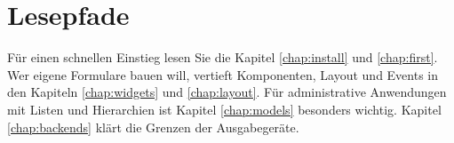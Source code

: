 \section{Lesepfade}
Für einen schnellen Einstieg lesen Sie die Kapitel
\ref{chap:install} und \ref{chap:first}. Wer eigene Formulare bauen will,
vertieft Komponenten, Layout und Events in den Kapiteln
\ref{chap:widgets} und \ref{chap:layout}. Für administrative Anwendungen
mit Listen und Hierarchien ist Kapitel \ref{chap:models} besonders wichtig.
Kapitel \ref{chap:backends} klärt die Grenzen der Ausgabegeräte.

